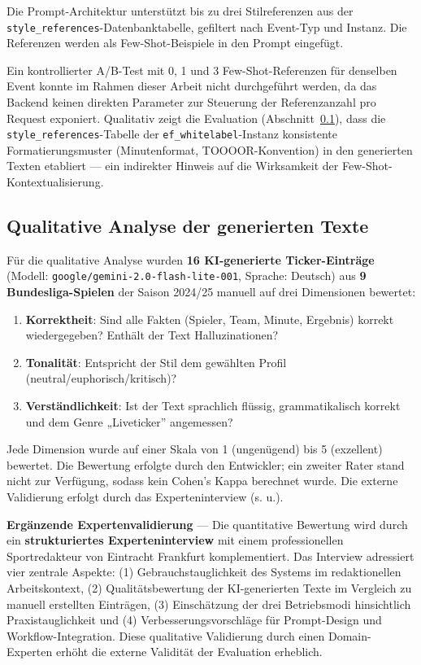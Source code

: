 Die Prompt-Architektur unterstützt bis zu drei Stilreferenzen aus der
\texttt{style\_references}-Datenbanktabelle, gefiltert nach Event-Typ
und Instanz. Die Referenzen werden als Few-Shot-Beispiele in den Prompt
eingefügt.

Ein kontrollierter A/B-Test mit 0, 1 und 3 Few-Shot-Referenzen für
denselben Event konnte im Rahmen dieser Arbeit nicht durchgeführt
werden, da das Backend keinen direkten Parameter zur Steuerung der
Referenzanzahl pro Request exponiert. Qualitativ zeigt die Evaluation
(Abschnitt~\ref{qualitative-analyse-der-generierten-texte}), dass die \texttt{style\_references}-Tabelle der
\texttt{ef\_whitelabel}-Instanz konsistente Formatierungsmuster
(Minutenformat, TOOOOR-Konvention) in den generierten Texten etabliert
--- ein indirekter Hinweis auf die Wirksamkeit der
Few-Shot-Kontextualisierung.

\subsection{Qualitative Analyse der generierten
Texte}\label{qualitative-analyse-der-generierten-texte}

Für die qualitative Analyse wurden \textbf{16 KI-generierte
Ticker-Einträge} (Modell: \texttt{google/gemini-2.0-flash-lite-001},
Sprache: Deutsch) aus \textbf{9 Bundesliga-Spielen} der Saison 2024/25
manuell auf drei Dimensionen bewertet:

\begin{enumerate}
\def\labelenumi{\arabic{enumi}.}
\tightlist
\item
  \textbf{Korrektheit}: Sind alle Fakten (Spieler, Team, Minute,
  Ergebnis) korrekt wiedergegeben? Enthält der Text Halluzinationen?
\item
  \textbf{Tonalität}: Entspricht der Stil dem gewählten Profil
  (neutral/euphorisch/kritisch)?
\item
  \textbf{Verständlichkeit}: Ist der Text sprachlich flüssig,
  grammatikalisch korrekt und dem Genre „Liveticker'' angemessen?
\end{enumerate}

Jede Dimension wurde auf einer Skala von 1 (ungenügend) bis 5
(exzellent) bewertet. Die Bewertung erfolgte durch den Entwickler; ein
zweiter Rater stand nicht zur Verfügung, sodass kein Cohen's Kappa
berechnet wurde. Die externe Validierung erfolgt durch das
Experteninterview (s. u.).

\textbf{Ergänzende Expertenvalidierung} --- Die quantitative Bewertung
wird durch ein \textbf{strukturiertes Experteninterview} mit einem
professionellen Sportredakteur von Eintracht Frankfurt komplementiert.
Das Interview adressiert vier zentrale Aspekte: (1)
Gebrauchstauglichkeit des Systems im redaktionellen Arbeitskontext, (2)
Qualitätsbewertung der KI-generierten Texte im Vergleich zu manuell
erstellten Einträgen, (3) Einschätzung der drei Betriebsmodi
hinsichtlich Praxistauglichkeit und (4) Verbesserungsvorschläge für
Prompt-Design und Workflow-Integration. Diese qualitative Validierung
durch einen Domain-Experten erhöht die externe Validität der Evaluation
erheblich.

